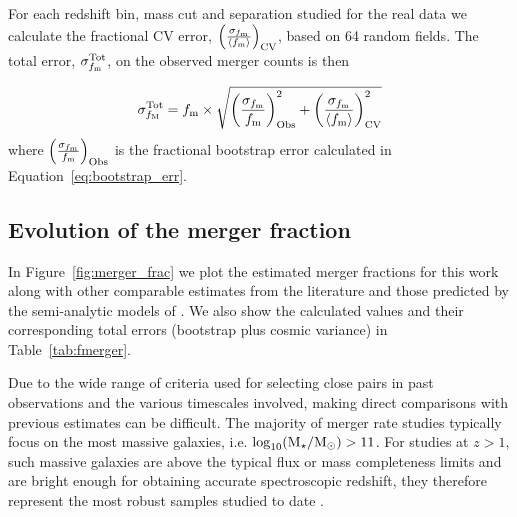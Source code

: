 For each redshift bin, mass cut and separation studied for the real data we calculate the fractional CV error, $\left (\frac{\sigma_{f_{\rm{m}}} }{ \left \langle f_{\text{m}}  \right \rangle}  \right )_{\text{CV}}$, based on 64 random fields. The total error, $\sigma_{f_{\rm{m}}}^{\text{Tot}} $, on the observed merger counts is then

\begin{equation}
\sigma_{f_{\rm{M}}}^{\text{Tot}}  = 
f_{\text{m}} \times
\sqrt{ 
\left (\frac{\sigma_{f_{\rm{m}}} }{ f_{\text{m}}}  \right )_{\text{Obs}}^{2}
+ 
\left (\frac{\sigma_{f_{\rm{m}}} }{ \left \langle f_{\text{m}}  \right \rangle}  \right )_{\text{CV}}^{2}
}	
\end{equation}
where $\left (\frac{\sigma_{f_{\rm{m}}} }{ f_{\text{m}}}  \right )_{\text{Obs}}$ is the fractional bootstrap error calculated in Equation~\ref{eq:bootstrap_err}.



\subsection{Evolution of the merger fraction}\label{sec:mergerfraction}
In Figure~\ref{fig:merger_frac} we plot the estimated merger fractions for this work along with other comparable estimates from the literature and those predicted by the semi-analytic models of \citet{Lu:2011hj}. We also show the calculated values and their corresponding total errors (bootstrap plus cosmic variance) in Table~\ref{tab:fmerger}. 

Due to the wide range of criteria used for selecting close pairs in past observations and the various timescales involved, making direct comparisons with previous estimates can be difficult. The majority of merger rate studies typically focus on the most massive galaxies, i.e. $\log_{10}(\text{M}_{\star} / \text{M}_{\odot}) > 11$. For studies at $z > 1$, such massive galaxies are above the typical flux or mass completeness limits and are bright enough for obtaining accurate spectroscopic redshift, they therefore represent the most robust samples studied to date \citep{Bluck:2009in,Man:2011jo}. 

